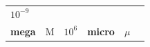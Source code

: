 {{\begin{center}
\begin{tabular}[t]{|l|l|l|l|l|l|}
    
        
                \begin{math}{10}^{-9}\end{math}
     \tabularnewline\cline{1-1}\cline{2-2}\cline{3-3}\cline{4-4}\cline{5-5}\cline{6-6}
    
    
        
                \textbf{mega}
               &
    
    
        M &
    
    
        
                \begin{math}{10}^{6}\end{math}
               &
    
    
        
                \textbf{micro}
               &
    
    
        
                \begin{math}\mu \end{math}
               &
    
    

\end{tabular}
\end{center}}}
